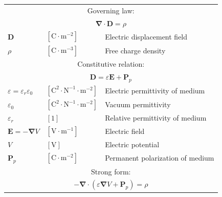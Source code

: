 \documentclass[letterpaper]{article}
\newcommand{\vect}[1]{\mathbf#1}
\newcommand{\nab}{\vect{\nabla}}
\begin{document}
\begin{table}[h!]
\centering
\begin{tabular}{lll}
\hline
\multicolumn{3}{c}{Governing law:} \\
\multicolumn{3}{c}{$\nab\cdot\vect{D}=\rho$}\\
$\vect{D}$ & $[\text{C}\cdot \text{m}^{-2}]$ & Electric displacement field\\
$\rho$ & $[\text{C}\cdot \text{m}^{-3}]$ & Free charge density\\
\hline

\multicolumn{3}{c}{Constitutive relation:} \\
\multicolumn{3}{c}{ $\vect{D}=\varepsilon\vect{E}+\vect{P}_{p}$}\\
$\varepsilon=\varepsilon_r\varepsilon_0$ & $[\text{C}^2 \cdot \text{N}^{-1} \cdot \text{m}^{-2}]$ & Electric permittivity of medium\\ %
$\varepsilon_0$ &  $[\text{C}^2 \cdot \text{N}^{-1} \cdot \text{m}^{-2}]$ & Vacuum permittivity\\
$\varepsilon_r$ & $[1]$ & Relative permittivity of medium\\
$\vect{E}=-\nab V$ & $[\text{V}\cdot \text{m}^{-1}]$ & Electric field\\
$V$ & $[\text{V}]$ & Electric potential\\
$\vect{P}_p$ & $[\text{C}\cdot \text{m}^{-2}]$ & Permanent polarization of medium\\
\hline

\multicolumn{3}{c}{Strong form:} \\[1pt]
\multicolumn{3}{c}{$-\nab\cdot\left(\varepsilon\nab V+\vect{P}_{p}\right)=\rho$}\\[3pt]
\hline


\end{tabular}
\end{table}
\end{document}
